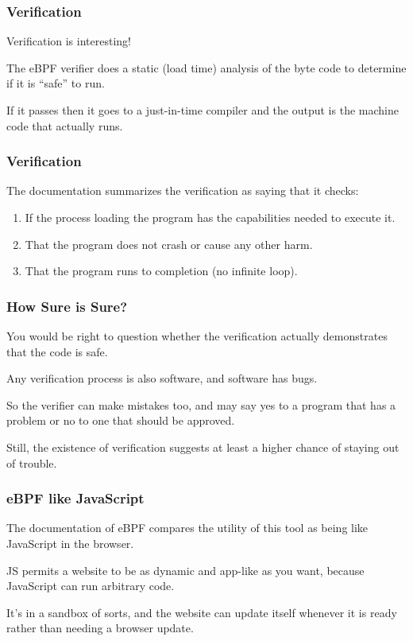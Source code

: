 \begin{frame}
\frametitle{Verification}

Verification is interesting! 

The eBPF verifier does a static (load time) analysis of the byte code to determine if it is ``safe'' to run.

If it passes then it goes to a just-in-time compiler and the output is the machine code that actually runs.

\end{frame}


\begin{frame}
\frametitle{Verification}

The documentation summarizes the verification as saying that it checks:

\begin{enumerate}
	\item If the process loading the program has the capabilities needed to execute it.
	\item That the program does not crash or cause any other harm.
	\item That the program runs to completion (no infinite loop).
\end{enumerate}

\end{frame}


\begin{frame}
\frametitle{How Sure is Sure?}

You would be right to question whether the verification actually demonstrates that the code is safe. 

Any verification process is also software, and software has bugs. 

So the verifier can make mistakes too, and may say yes to a program that has a problem or no to one that should be approved. 

Still, the existence of verification suggests at least a higher chance of staying out of trouble.

\end{frame}


\begin{frame}
\frametitle{eBPF like JavaScript}

The documentation of eBPF compares the utility of this tool as being like JavaScript in the browser.

JS permits a website to be as dynamic and app-like as you want, because JavaScript can run arbitrary code.

It's in a sandbox of sorts, and the website can update itself whenever it is ready rather than needing a browser update. 

\end{frame}


